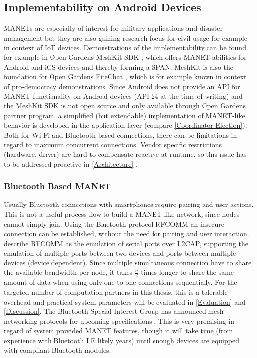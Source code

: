 \subsection{Implementability on Android Devices} \label{Implementability}

\glspl{MANET} are especially of interest for military applications and disaster management but they are also gaining research focus for civil usage for example in context of \gls{IoT} devices. Demonstrations of the implementability can be found for example in Open Gardens MeshKit \gls{SDK} \autocite{Online:MeshKit}, which offers \gls{MANET} abilities for Android and iOS devices and thereby forming a \gls{SPAN}. MeshKit is also the foundation for Open Gardens FireChat \autocite{Online:FireChat}, which is for example known in context of pro-democracy demonstrations. Since Android does not provide an \gls{API} for \gls{MANET} functionality on Android devices (\gls{API} 24 at the time of writing) and the MeshKit \gls{SDK} is not open source and only available through Open Gardens partner program, a simplified (but extendable) implementation of \gls{MANET}-like behavior is developed in the application layer (compare \ref{Coordinator Election}).
Both for Wi-Fi and Bluetooth based connections, there can be limitations in regard to maximum concurrent connections. Vendor specific restrictions (hardware, driver) are hard to compensate reactive at runtime, so this issue has to be addressed proactive in \ref{Architecture} .

\subsubsection{Bluetooth Based \gls{MANET}}

Usually Bluetooth connections with smartphones require pairing and user actions. This is not a useful process flow to build a \gls{MANET}-like network, since nodes cannot simply join.
Using the Bluetooth protocol \gls{RFCOMM} an insecure connection can be established, without the need for pairing and user interaction. \textcite{RFCOMM2012} describe \gls{RFCOMM} as the emulation of serial ports over \gls{L2CAP}, supporting the emulation of multiple ports between two devices and ports between multiple devices (device dependent).
Since multiple simultaneous connection have to share the available bandwidth per node, it takes $\frac{n}{2}$ times longer to share the same amount of data when using only one-to-one connections sequentially. For the targeted number of computation partners in this thesis, this is a tolerable overhead and practical system parameters will be evaluated in \ref{Evaluation} and \ref{Discussion}.
The Bluetooth Special Interest Group has announced mesh networking protocols for upcoming specifications \autocite{Online:BluetoothMesh}. This is very promising in regard of system provided \gls{MANET} features, though it will take time (from experience with Bluetooth LE likely years) until enough devices are equipped with compliant Bluetooth modules.


